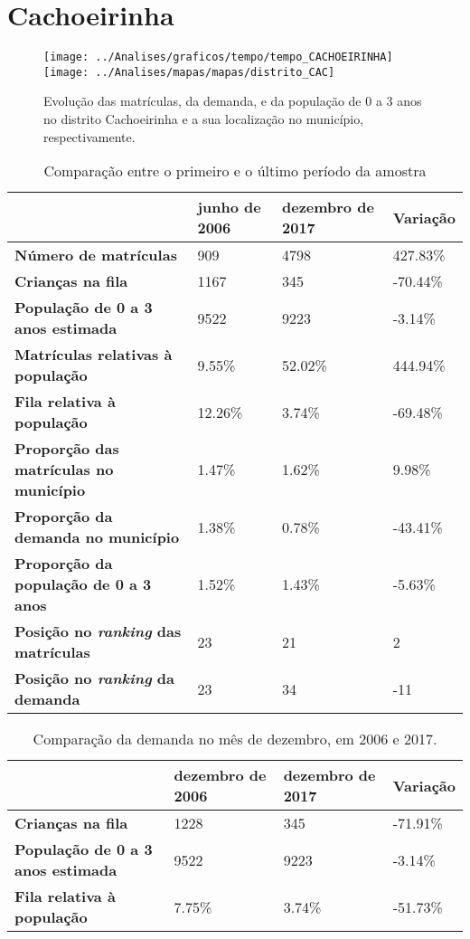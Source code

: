 \section{Cachoeirinha}
\begin{figure}[H]
\centering
\texttt{[image: ../Analises/graficos/tempo/tempo\_CACHOEIRINHA]}
\texttt{[image: ../Analises/mapas/mapas/distrito\_CAC]}
\caption{Evolução das matrículas, da demanda, e da população de 0 a 3 anos no distrito Cachoeirinha e a sua localização no município, respectivamente.}
\end{figure}
\begin{table}[H]
\begin{tabular}{l|l|l|l}
\textbf{}                                      & \textbf{junho de 2006}       & \textbf{dezembro de 2017}    & \textbf{Variação} \\ \hline
\textbf{Número de matrículas}                  & 909 & 4798 & 427.83\% \\ \hline
\textbf{Crianças na fila}                      & 1167 & 345 & -70.44\% \\ \hline
\textbf{População de 0 a 3 anos estimada}      & 9522 & 9223 & -3.14\% \\ \hline
\textbf{Matrículas relativas à população}      & 9.55\% & 52.02\% & 444.94\% \\ \hline
\textbf{Fila relativa à população}             & 12.26\% & 3.74\% & -69.48\% \\ \hline
\textbf{Proporção das matrículas no município} & 1.47\% & 1.62\% & 9.98\% \\ \hline
\textbf{Proporção da demanda no município}     & 1.38\% & 0.78\% & -43.41\% \\ \hline
\textbf{Proporção da população de 0 a 3 anos}  & 1.52\% & 1.43\% & -5.63\% \\ \hline
\textbf{Posição no \textit{ranking} das matrículas}     & 23 & 21 & 2 \\ \hline
\textbf{Posição no \textit{ranking} da demanda}         & 23 & 34 & -11 \\ 
\end{tabular}
\caption{Comparação entre o primeiro e o último período da amostra}
\end{table}
\begin{table}[H]
\begin{tabular}{l|l|l|l}
\textbf{}                                 & \textbf{dezembro de 2006} & \textbf{dezembro de 2017} & \textbf{Variação} \\ \hline
\textbf{Crianças na fila}                      & 1228 & 345 & -71.91\% \\ \hline
\textbf{População de 0 a 3 anos estimada}      & 9522 & 9223 & -3.14\% \\ \hline
\textbf{Fila relativa à população}             & 7.75\% & 3.74\% & -51.73\% \\
\end{tabular}
\caption{Comparação da demanda no mês de dezembro, em 2006 e 2017.}
\end{table}
